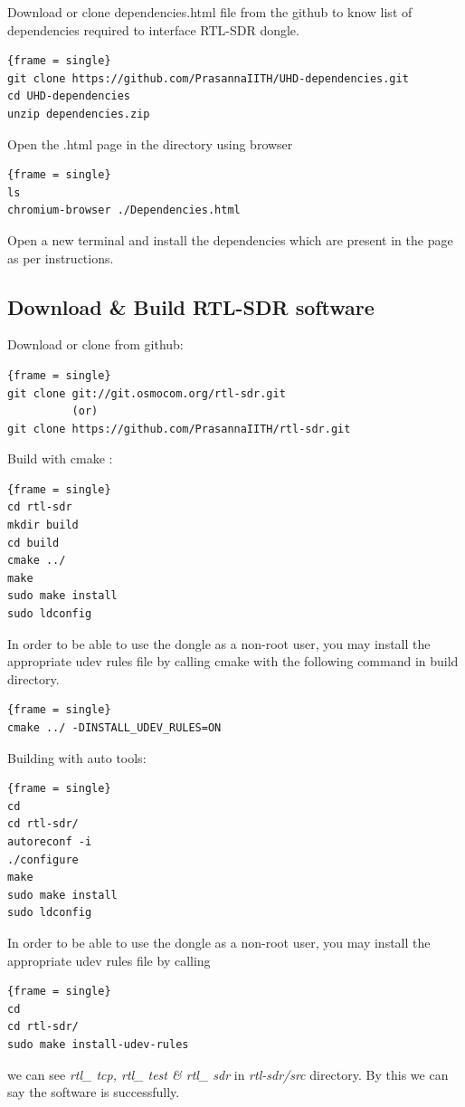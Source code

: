 \documentclass[journal,12pt,twocolumn]{IEEEtran}
\begin{document}
Download or clone dependencies.html file from the github to know list of dependencies required to interface RTL-SDR dongle.
\begin{lstlisting}{frame = single}
git clone https://github.com/PrasannaIITH/UHD-dependencies.git
cd UHD-dependencies
unzip dependencies.zip
\end{lstlisting}

Open the .html page in the directory using browser 
\begin{lstlisting}{frame = single}
ls
chromium-browser ./Dependencies.html
\end{lstlisting}

Open a new terminal and install the dependencies which are present in the page as per instructions.
\subsection{Download \& Build RTL-SDR software}
Download or clone from github:
\begin{lstlisting}{frame = single}
git clone git://git.osmocom.org/rtl-sdr.git
          (or)
git clone https://github.com/PrasannaIITH/rtl-sdr.git
\end{lstlisting}
Build with cmake :
\begin{lstlisting}{frame = single}
cd rtl-sdr
mkdir build
cd build
cmake ../
make 
sudo make install
sudo ldconfig 
\end{lstlisting}

In order to be able to use the dongle as a non-root user, you may install the appropriate udev rules file by calling cmake with the following command in build directory. 
\begin{lstlisting}{frame = single}
cmake ../ -DINSTALL_UDEV_RULES=ON
\end{lstlisting}

Building with auto tools: 
\begin{lstlisting}{frame = single}
cd
cd rtl-sdr/
autoreconf -i
./configure
make
sudo make install
sudo ldconfig
\end{lstlisting}

In order to be able to use the dongle as a non-root user, you may install the appropriate udev rules file by calling
\begin{lstlisting}{frame = single}
cd
cd rtl-sdr/
sudo make install-udev-rules
\end{lstlisting}

we can see \textit{rtl\_ tcp, rtl\_ test \& rtl\_ sdr} in \textit{rtl-sdr/src} directory. By this we can say the software is  successfully.
\end{document}
